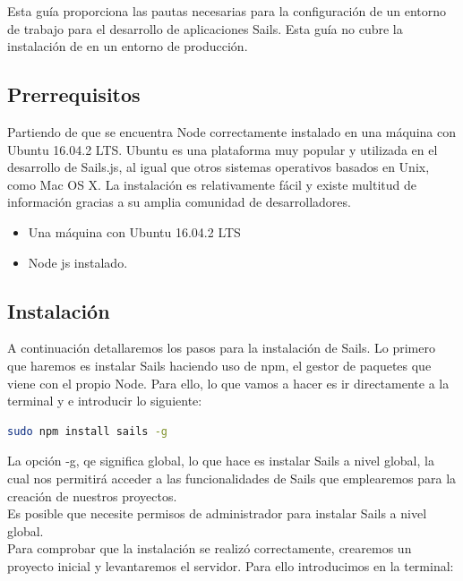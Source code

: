 Esta guía proporciona las pautas necesarias para la configuración de un entorno de trabajo para el desarrollo de aplicaciones Sails. Esta guía no cubre la instalación de en un entorno de producción.\\

\subsection{Prerrequisitos}

Partiendo de que se encuentra Node correctamente instalado en una máquina con Ubuntu 16.04.2 LTS. Ubuntu es una plataforma muy popular y utilizada en el desarrollo de Sails.js, al igual que otros sistemas operativos basados en Unix, como Mac OS X. La instalación es relativamente fácil y existe multitud de información gracias a su amplia comunidad de desarrolladores.\\

\begin{itemize}

\item{Una máquina con Ubuntu 16.04.2 LTS }
\item{Node js instalado.}


\end{itemize}

\subsection{Instalación}

A continuación detallaremos los pasos para la instalación de Sails. Lo primero que haremos es instalar Sails haciendo uso de npm, el gestor de paquetes que viene con el propio Node. Para ello, lo que vamos a hacer es ir directamente a la terminal y e introducir lo siguiente:\\

\begin{lstlisting}[language=bash]
sudo npm install sails -g
\end{lstlisting}

La opción -g, qe significa global, lo que hace es instalar Sails a nivel global, la cual nos permitirá acceder a las funcionalidades de Sails que emplearemos para la creación de nuestros proyectos.\\

Es posible que necesite permisos de administrador para instalar Sails a nivel global.\\

Para comprobar que la instalación se realizó correctamente, crearemos un proyecto inicial y levantaremos el servidor. Para ello introducimos en la terminal:\\

